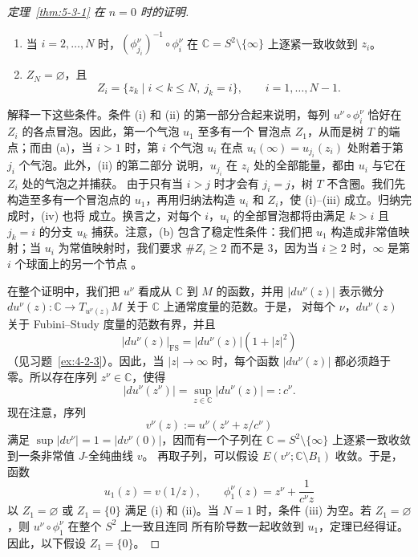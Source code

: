 \begin{proof}[定理~\ref{thm:5-3-1} 在 $n=0$ 时的证明]
\begin{enumerate}[label=(\roman*),leftmargin=3em]
\item 当 $i=2,\ldots,N$ 时，$(\phi_{j_i}^\nu)^{-1}\circ\phi_i^\nu$ 在
$\mathbb C=S^2\setminus\{\infty\}$ 上逐紧一致收敛到 $z_i$。

\item $Z_N=\varnothing$，且
\[
  Z_i=\{z_k\mid i<k\le N,\ j_k=i\},
  \qquad i=1,\ldots,N-1.
\]
\end{enumerate}

解释一下这些条件。条件 (i) 和 (ii) 的第一部分合起来说明，每列
$u^\nu\circ\phi_i^\nu$ 恰好在 $Z_i$ 的各点冒泡。因此，第一个气泡 $u_1$ 至多有一个
冒泡点 $Z_1$，从而是树 $T$ 的端点；而由 (a)，当 $i>1$ 时，第 $i$ 个气泡 $u_i$
在点 $u_i(\infty)=u_{j_i}(z_i)$ 处附着于第 $j_i$ 个气泡。此外，(ii) 的第二部分
说明，$u_{j_i}$ 在 $z_i$ 处的全部能量，都由 $u_i$ 与它在 $Z_i$ 处的气泡之并捕获。
由于只有当 $i>j$ 时才会有 $j_i=j$，树 $T$ 不含圈。我们先构造至多有一个冒泡点的
$u_1$，再用归纳法构造 $u_i$ 和 $Z_i$，使 (i)--(iii) 成立。归纳完成时，(iv) 也将
成立。换言之，对每个 $i$，$u_i$ 的全部冒泡都将由满足 $k>i$ 且 $j_k=i$ 的分支
$u_k$ 捕获。注意，(b) 包含了稳定性条件：我们把 $u_1$ 构造成非常值映射；当 $u_i$
为常值映射时，我们要求 $\#Z_i\ge2$ 而不是 $3$，因为当 $i\ge2$
时，$\infty$ 是第 $i$ 个球面上的另一个节点
。

在整个证明中，我们把 $u^\nu$ 看成从 $\mathbb C$ 到 $M$ 的函数，并用
$|du^\nu(z)|$ 表示微分
$du^\nu(z):\mathbb C\to T_{u^\nu(z)}M$ 关于 $\mathbb C$ 上通常度量的范数。于是，
对每个 $\nu$，$du^\nu(z)$ 关于 Fubini--Study 度量的范数有界，并且
\[
  |du^\nu(z)|_{\mathrm{FS}}=|du^\nu(z)|(1+|z|^2)
\]
（见习题~\ref{ex:4-2-3}）。因此，当 $|z|\to\infty$ 时，每个函数 $|du^\nu(z)|$ 都必须趋于
零。所以存在序列 $z^\nu\in\mathbb C$，使得
\[
  |du^\nu(z^\nu)|=\sup_{z\in\mathbb C}|du^\nu(z)|=:c^\nu.
\]
现在注意，序列
\[
  v^\nu(z):=u^\nu(z^\nu+z/c^\nu)
\]
满足 $\sup|dv^\nu|=1=|dv^\nu(0)|$，因而有一个子列在
$\mathbb C=S^2\setminus\{\infty\}$ 上逐紧一致收敛到一条非常值 $J$-全纯曲线 $v$。
再取子列，可以假设 $E(v^\nu;\mathbb C\setminus B_1)$ 收敛。于是，函数
\[
  u_1(z)=v(1/z),
  \qquad
  \phi_1^\nu(z)=z^\nu+\frac1{c^\nu z}
\]
以 $Z_1=\varnothing$ 或 $Z_1=\{0\}$ 满足 (i) 和 (ii)。当 $N=1$ 时，条件 (iii)
为空。若 $Z_1=\varnothing$，则 $u^\nu\circ\phi_1^\nu$ 在整个 $S^2$ 上一致且连同
所有阶导数一起收敛到 $u_1$，定理已经得证。因此，以下假设 $Z_1=\{0\}$。


\end{proof}
